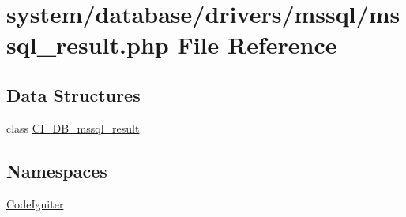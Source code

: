 \hypertarget{mssql__result_8php}{}\section{system/database/drivers/mssql/mssql\+\_\+result.php File Reference}
\label{mssql__result_8php}
\subsection*{Data Structures}
\begin{DoxyCompactItemize}
\item 
class \mbox{\hyperlink{class_c_i___d_b__mssql__result}{C\+I\+\_\+\+D\+B\+\_\+mssql\+\_\+result}}
\end{DoxyCompactItemize}
\subsection*{Namespaces}
\begin{DoxyCompactItemize}
\item 
 \mbox{\hyperlink{namespace_code_igniter}{Code\+Igniter}}
\end{DoxyCompactItemize}
